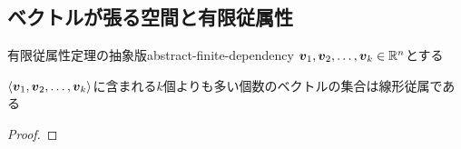 \documentclass[../../../topic_linear-algebra]{subfiles}
\begin{document}
\subsection{ベクトルが張る空間と有限従属性}

\begin{theorem}{有限従属性定理の抽象版}{abstract-finite-dependency}
  $\vb*{v}_1, \vb*{v}_2, \dots, \vb*{v}_k \in \mathbb{R}^n$とする

  $\langle \vb*{v}_1, \vb*{v}_2, \dots, \vb*{v}_k \rangle$に含まれる$k$個よりも多い個数のベクトルの集合は線形従属である
\end{theorem}

\begin{proof}
\end{proof}
\end{document}
